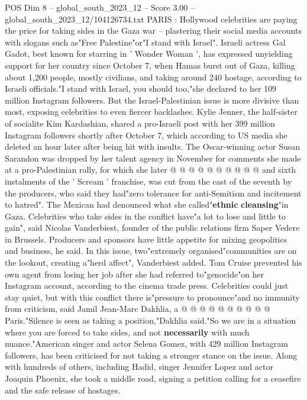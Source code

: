 \begin{textsample}{POS Dim 8 – global\_south\_2023\_12 – Score 3.00 – global\_south\_2023\_12/104126734.txt}  \label{ex:f8_pos_439}
PARIS : Hollywood celebrities are paying the price for taking sides in the Gaza war -- plastering their social media accounts with slogans such as"Free Palestine"or"I stand with Israel".
Israeli actress Gal Gadot, best known for starring in ' Wonder Woman ', has expressed unyielding support for her country since October 7, when Hamas burst out of Gaza, killing about 1,200 people, mostly civilians, and taking around 240 hostage, according to Israeli officials."I stand with Israel, you should too,"she declared to her 109 million Instagram followers.
But the Israel-Palestinian issue is more divisive than most, exposing celebrities to even fiercer backlashes.
Kylie Jenner, the half-sister of socialite Kim Kardashian, shared a pro-Israeli post with her 399 million Instagram followers shortly after October 7, which according to US media she deleted an hour later after being hit with insults.
The Oscar-winning actor Susan Sarandon was dropped by her talent agency in November for comments she made at a pro-Palestinian rally, for which she later @ @ @ @ @ @ @ @ @ @ and sixth instalments of the ' Scream ' franchise, was cut from the cast of the seventh by the producers, who said they had"zero tolerance for anti-Semitism and incitement to hatred".
The Mexican had denounced what she called"\textbf{ethnic} \textbf{cleansing}"in Gaza.
Celebrities who take sides in the conflict have"a lot to lose and little to gain", said Nicolas Vanderbiest, founder of the public relations firm Saper Vedere in Brussels.
Producers and sponsors have little appetite for mixing geopolitics and business, he said.
In this issue, two"extremely organised"communities are on the lookout, creating a"herd affect", Vanderbiest added.
Tom Cruise prevented his own agent from losing her job after she had referred to"genocide"on her Instagram account, according to the cinema trade press.
Celebrities could just stay quiet, but with this conflict there is"pressure to pronounce"and no immunity from criticism, said Jamil Jean-Marc Dakhlia, a @ @ @ @ @ @ @ @ @ @ Paris."Silence is seen as taking a position,"Dakhlia said."So we are in a situation where you are forced to take sides, and not \textbf{necessarily} with much nuance."American singer and actor Selena Gomez, with 429 million Instagram followers, has been criticised for not taking a stronger stance on the issue.
Along with hundreds of others, including Hadid, singer Jennifer Lopez and actor Joaquin Phoenix, she took a middle road, signing a petition calling for a ceasefire and the safe release of hostages.

\end{textsample}
